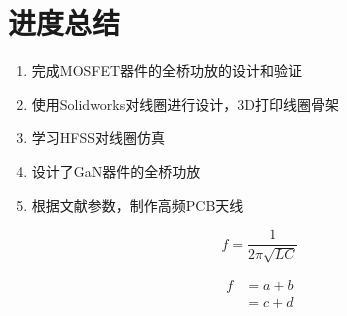 ﻿\documentclass[UTF-8,12pt]{ctexart}
\begin{document}
\section{进度总结}
        \begin{enumerate}[$\bullet$]
        \item 完成MOSFET器件的全桥功放的设计和验证
        \item 使用Solidworks对线圈进行设计，3D打印线圈骨架
        \item 学习HFSS对线圈仿真
        \item 设计了GaN器件的全桥功放
        \item 根据文献参数，制作高频PCB天线
        
        
\end{enumerate}

\[
f=\frac{1}{2\pi\sqrt{LC}}
\]

\[\begin{split}
f &= a+b  \\
  &= c+d  \\
\end{split}\]



\end{document}

